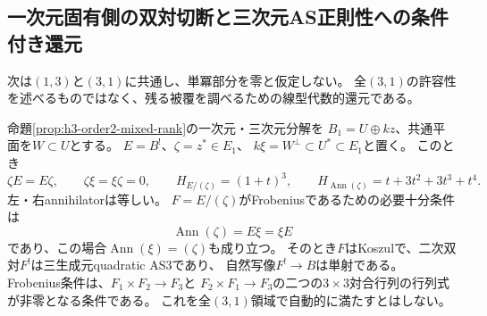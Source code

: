\subsection{一次元固有側の双対切断と三次元AS正則性への条件付き還元}
\label{subsec:h3-order2-dual-hyperplane}
次は$(1,3)$と$(3,1)$に共通し、単冪部分を零と仮定しない。
全$(3,1)$の許容性を述べるものではなく、残る被覆を調べるための線型代数的還元である。

\begin{proposition}\label{prop:h3-order2-dual-hyperplane}
命題\ref{prop:h3-order2-mixed-rank}の一次元・三次元分解を
$B_1=U\oplus kz$、共通平面を$W\subset U$とする。
$E=B^!$、$\zeta=z^*\in E_1$、
$k\xi=W^\perp\subset U^*\subset E_1$と置く。
このとき
\[
 \zeta E=E\zeta,\qquad \zeta\xi=\xi\zeta=0,
 \qquad H_{E/(\zeta)}=(1+t)^3,
 \qquad H_{\operatorname{Ann}(\zeta)}=t+3t^2+3t^3+t^4.
\]
左・右annihilatorは等しい。
$F=E/(\zeta)$がFrobeniusであるための必要十分条件は
\[
 \operatorname{Ann}(\zeta)=E\xi=\xi E
\]
であり、この場合$\operatorname{Ann}(\xi)=(\zeta)$も成り立つ。
そのとき$F$はKoszulで、二次双対$F^!$は三生成元quadratic AS3であり、
自然写像$F^!\to B$は単射である。
Frobenius条件は、$F_1\times F_2\to F_3$と
$F_2\times F_1\to F_3$の二つの$3\times3$対合行列の行列式が非零となる条件である。
これを全$(3,1)$領域で自動的に満たすとはしない。
\end{proposition}
